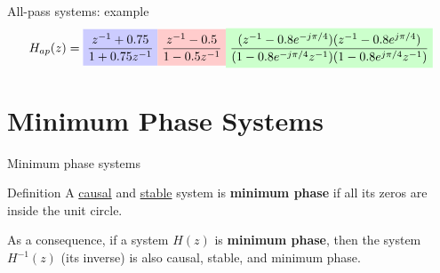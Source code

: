 \documentclass[10pt, aspectratio=169]{beamer}
\begin{document}
%
\begin{frame}{All-pass systems: example}
\begin{equation*}
H_{ap}(z) = \tikz[baseline]{\node[fill=blue!20,anchor=base] {$\displaystyle\frac{z^{-1}+ 0.75}{1 + 0.75z^{-1}}$};}\tikz[baseline]{\node[fill=red!20,anchor=base] {$\displaystyle\frac{z^{-1} - 0.5}{1 -0.5z^{-1}}$};}\tikz[baseline]{\node[fill=green!20,anchor=base] {$\displaystyle\frac{(z^{-1} - 0.8e^{-j\pi/4})(z^{-1} - 0.8e^{j\pi/4})}{(1 - 0.8e^{-j\pi/4}z^{-1})(1 - 0.8e^{j\pi/4}z^{-1})}$};}
\end{equation*}

\begin{center}
	\resizebox{\linewidth}{!}{}
\end{center}
\end{frame}

\section{Minimum Phase Systems}
%
\begin{frame}{Minimum phase systems}
	\begin{block}{Definition}
		A \underline{causal} and \underline{stable} system is \textbf{minimum phase} if all its zeros are inside the unit circle.
	\end{block}

	As a consequence, if a system $H(z)$ is \textbf{minimum phase}, then the system $H^{-1}(z)$ (its inverse) is also causal, stable, and minimum phase.
	
\end{frame}
\end{document}

